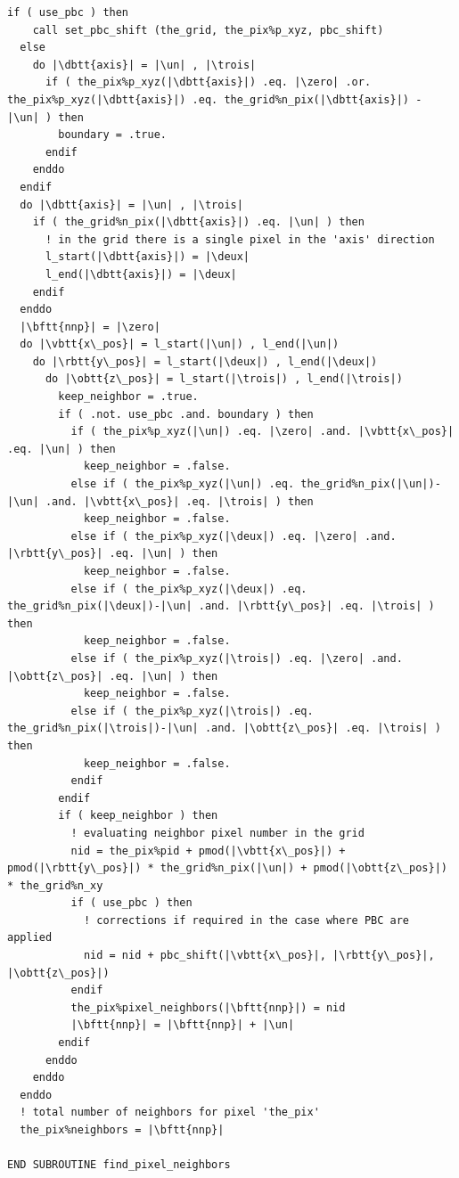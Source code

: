 \begin{lstlisting}[language={[90]FORTRAN}]
  if ( use_pbc ) then
    call set_pbc_shift (the_grid, the_pix%p_xyz, pbc_shift)
  else
    do |\dbtt{axis}| = |\un| , |\trois|
      if ( the_pix%p_xyz(|\dbtt{axis}|) .eq. |\zero| .or. the_pix%p_xyz(|\dbtt{axis}|) .eq. the_grid%n_pix(|\dbtt{axis}|) - |\un| ) then
        boundary = .true.
      endif
    enddo
  endif
  do |\dbtt{axis}| = |\un| , |\trois|
    if ( the_grid%n_pix(|\dbtt{axis}|) .eq. |\un| ) then
      ! in the grid there is a single pixel in the 'axis' direction
      l_start(|\dbtt{axis}|) = |\deux|
      l_end(|\dbtt{axis}|) = |\deux|
    endif
  enddo
  |\bftt{nnp}| = |\zero|
  do |\vbtt{x\_pos}| = l_start(|\un|) , l_end(|\un|)
    do |\rbtt{y\_pos}| = l_start(|\deux|) , l_end(|\deux|)
      do |\obtt{z\_pos}| = l_start(|\trois|) , l_end(|\trois|)
        keep_neighbor = .true.
        if ( .not. use_pbc .and. boundary ) then
          if ( the_pix%p_xyz(|\un|) .eq. |\zero| .and. |\vbtt{x\_pos}| .eq. |\un| ) then
            keep_neighbor = .false.
          else if ( the_pix%p_xyz(|\un|) .eq. the_grid%n_pix(|\un|)-|\un| .and. |\vbtt{x\_pos}| .eq. |\trois| ) then
            keep_neighbor = .false.
          else if ( the_pix%p_xyz(|\deux|) .eq. |\zero| .and. |\rbtt{y\_pos}| .eq. |\un| ) then
            keep_neighbor = .false.
          else if ( the_pix%p_xyz(|\deux|) .eq. the_grid%n_pix(|\deux|)-|\un| .and. |\rbtt{y\_pos}| .eq. |\trois| ) then
            keep_neighbor = .false.
          else if ( the_pix%p_xyz(|\trois|) .eq. |\zero| .and. |\obtt{z\_pos}| .eq. |\un| ) then
            keep_neighbor = .false.
          else if ( the_pix%p_xyz(|\trois|) .eq. the_grid%n_pix(|\trois|)-|\un| .and. |\obtt{z\_pos}| .eq. |\trois| ) then
            keep_neighbor = .false.
          endif
        endif
        if ( keep_neighbor ) then
          ! evaluating neighbor pixel number in the grid
          nid = the_pix%pid + pmod(|\vbtt{x\_pos}|) + pmod(|\rbtt{y\_pos}|) * the_grid%n_pix(|\un|) + pmod(|\obtt{z\_pos}|) * the_grid%n_xy
          if ( use_pbc ) then
            ! corrections if required in the case where PBC are applied
            nid = nid + pbc_shift(|\vbtt{x\_pos}|, |\rbtt{y\_pos}|, |\obtt{z\_pos}|)
          endif
          the_pix%pixel_neighbors(|\bftt{nnp}|) = nid
          |\bftt{nnp}| = |\bftt{nnp}| + |\un|
        endif
      enddo
    enddo
  enddo
  ! total number of neighbors for pixel 'the_pix'
  the_pix%neighbors = |\bftt{nnp}|
  
END SUBROUTINE find_pixel_neighbors
\end{lstlisting}

\clearpage

